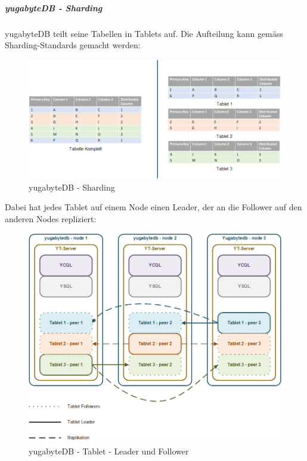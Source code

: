 \begin{flushleft}
    \subparagraph{yugabyteDB - Sharding}
    yugabyteDB teilt seine Tabellen in Tablets auf.
    Die Aufteilung kann gemäss Sharding-Standards gemacht werden:
    \begin{figure}[H]
        \centering
        \includegraphics[width=0.8\linewidth]{source/implementation/evaluation/postgresql_ha_solutions/yugabytedb/yugabytedb-sharding-tablets}
        \caption{yugabyteDB - Sharding}
        \label{fig:yugabytedb-sharding-tablets}
    \end{figure}

    Dabei hat jedes Tablet auf einem Node einen Leader, der an die Follower auf den anderen Nodes repliziert:
    \begin{figure}[H]
        \centering
        \includegraphics[width=0.8\linewidth]{source/implementation/evaluation/postgresql_ha_solutions/yugabytedb/yugabytedb-tablet-masters}
        \caption{yugabyteDB - Tablet - Leader und Follower}
        \label{fig:yugabytedb-tablet-masters}
    \end{figure}




\end{flushleft}

